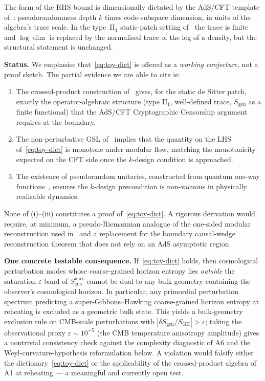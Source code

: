 \noindent The form of the RHS bound is dimensionally dictated by the
AdS/CFT template of~\cite{CryptoCensorship}: pseudorandomness depth
$k$ times code-subspace dimension, in units of the algebra's trace
scale. In the type~II$_1$ static-patch setting of~\cite{CLPW2023} the
trace is finite and $\log\dim$ is replaced by the normalised trace
of the log of a density, but the structural statement is unchanged.

\medskip\noindent\textbf{Status.}\;
We emphasise that~\eqref{eq:toy-dict} is offered as a \emph{working
conjecture}, not a proof sketch. The partial evidence we are able to
cite is:
\begin{enumerate}
\item[(i)] The crossed-product construction
of~\cite{CLPW2023,DEHK2025a,DEHK2025b} gives, for the static de Sitter
patch, exactly the operator-algebraic structure (type II$_1$, well-defined
trace, $S_{\mathrm{gen}}$ as a finite functional) that the AdS/CFT
Cryptographic Censorship argument requires at the boundary.
\item[(ii)] The non-perturbative GSL of~\cite{FaulknerSperanza2024,Kirklin2025}
implies that the quantity on the LHS of~\eqref{eq:toy-dict} is monotone
under modular flow, matching the monotonicity expected on the CFT side
once the $k$-design condition is approached.
\item[(iii)] The existence of pseudorandom unitaries, constructed from
quantum one-way functions~\cite{MaHuang2025}, ensures the $k$-design
precondition is non-vacuous in physically realisable dynamics.
\end{enumerate}

None of (i)--(iii) constitutes a proof of~\eqref{eq:toy-dict}. A rigorous
derivation would require, at minimum, a pseudo-Riemannian analogue of
the one-sided modular reconstruction used in~\cite{CryptoCensorship}
and a replacement for the boundary causal-wedge reconstruction theorem
that does not rely on an AdS asymptotic region.

\medskip\noindent\textbf{One concrete testable consequence.}\;
If~\eqref{eq:toy-dict} holds, then cosmological perturbation modes whose
coarse-grained horizon entropy lies \emph{outside} the saturation
$\varepsilon$-band of $S_{\mathrm{gen}}^{\max}$ cannot be dual to any
bulk geometry containing the observer's cosmological horizon. In
particular, any primordial perturbation spectrum predicting a
super-Gibbons--Hawking coarse-grained horizon entropy at reheating is
excluded as a geometric bulk state. This yields a bulk-geometry
exclusion rule on CMB-scale perturbations with $|\delta S_{\mathrm{gen}}
/ S_{\mathrm{GH}}| > \varepsilon$; taking the observational proxy
$\varepsilon \sim 10^{-5}$ (the CMB temperature anisotropy amplitude)
gives a nontrivial consistency check against the complexity diagnostic of
A6 and the Weyl-curvature-hypothesis reformulation below. A violation
would falsify either the dictionary~\eqref{eq:toy-dict} or the
applicability of the crossed-product algebra of A1 at reheating --- a
meaningful and currently open test.

